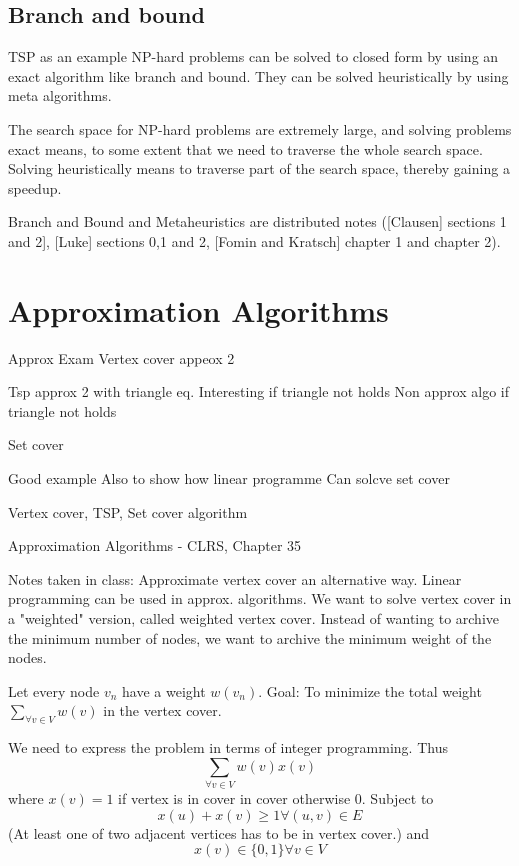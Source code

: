 \documentclass[10pt]{article}
\begin{document}
\subsection{Branch and bound} %
\label{sub:branch_and_bound}
TSP as an example
NP-hard problems can be solved to closed form by using an exact algorithm like branch and bound. They can be solved heuristically by using meta algorithms.

The search space for NP-hard problems are extremely large, and solving problems exact means, to some extent that we need to traverse the whole search space. Solving heuristically means to traverse part of the search space, thereby gaining a speedup.



Branch and Bound and Metaheuristics are  distributed notes ([Clausen] sections 1 and 2], [Luke] sections 0,1 and 2, [Fomin and Kratsch] chapter 1 and chapter 2).                                                                                                                                                          

\section{Approximation Algorithms} %
\label{sec:approximation_algorithms}

Approx Exam
Vertex cover appeox 2

Tsp approx 2 with triangle eq. Interesting if triangle not holds
Non approx algo if triangle not holds

Set cover

Good example Also to show how linear programme Can solcve set cover

Vertex cover, TSP, Set cover algorithm

Approximation Algorithms - CLRS, Chapter 35

Notes taken in class:
Approximate vertex cover an alternative way. Linear programming can be used in approx. algorithms. We want to solve vertex cover in a "weighted" version, called weighted vertex cover. Instead of wanting to archive the minimum number of nodes, we want to archive the minimum weight of the nodes.

Let every node $v_n$ have a weight $w(v_n)$. Goal: To minimize the total weight $\sum_{\forall v \in V} w(v)$ in the vertex cover. 


We need to express the problem in terms of integer programming. Thus
\begin{equation}
\sum_{\forall v \in V} w(v) x(v)  
\end{equation}
where $x(v)=1$ if vertex is in cover in cover otherwise 0. Subject to
\begin{equation}
  x(u)+x(v) \geq 1 \forall (u,v) \in E
\end{equation}
(At least one of two adjacent vertices has to be in vertex cover.) and
\begin{equation}
    x(v)  \in \{0,1\} \forall v \in V 
\end{equation}
\end{document}
